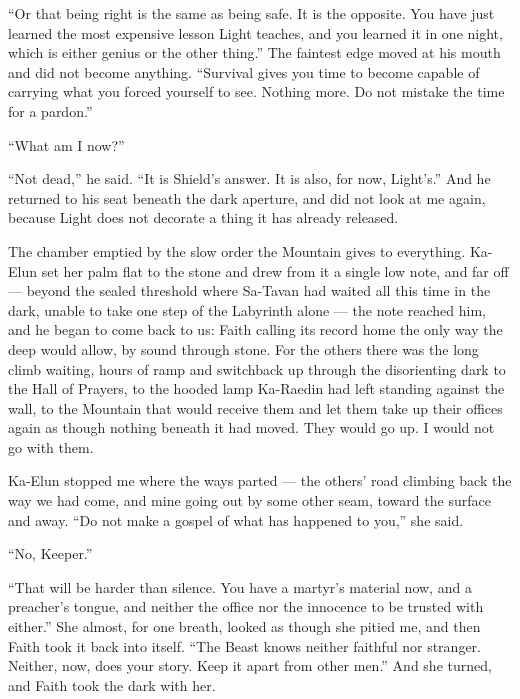 ``Or that being right is the same as being safe. It is the opposite. You have just learned the most expensive lesson Light teaches, and you learned it in one night, which is either genius or the other thing.'' The faintest edge moved at his mouth and did not become anything. ``Survival gives you time to become capable of carrying what you forced yourself to see. Nothing more. Do not mistake the time for a pardon.''\par

``What am I now?''\par

``Not dead,'' he said. ``It is Shield's answer. It is also, for now, Light's.'' And he returned to his seat beneath the dark aperture, and did not look at me again, because Light does not decorate a thing it has already released.\par

The chamber emptied by the slow order the Mountain gives to everything. Ka-Elun set her palm flat to the stone and drew from it a single low note, and far off — beyond the sealed threshold where Sa-Tavan had waited all this time in the dark, unable to take one step of the Labyrinth alone — the note reached him, and he began to come back to us: Faith calling its record home the only way the deep would allow, by sound through stone. For the others there was the long climb waiting, hours of ramp and switchback up through the disorienting dark to the Hall of Prayers, to the hooded lamp Ka-Raedin had left standing against the wall, to the Mountain that would receive them and let them take up their offices again as though nothing beneath it had moved. They would go up. I would not go with them.\par

Ka-Elun stopped me where the ways parted — the others' road climbing back the way we had come, and mine going out by some other seam, toward the surface and away. ``Do not make a gospel of what has happened to you,'' she said.\par

``No, Keeper.''\par

``That will be harder than silence. You have a martyr's material now, and a preacher's tongue, and neither the office nor the innocence to be trusted with either.'' She almost, for one breath, looked as though she pitied me, and then Faith took it back into itself. ``The Beast knows neither faithful nor stranger. Neither, now, does your story. Keep it apart from other men.'' And she turned, and Faith took the dark with her.\par

